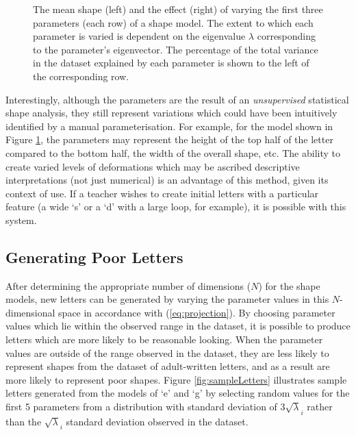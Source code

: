 \documentclass{sig-alternate}
\begin{document}
\begin{figure}[thpb]
\centering
{}
\caption[The mean shape and the effect of varying the first three parameters of
the shape model derived from PCA from the dataset of print `s'
shapes.]{\label{fig:deviations_sPrint}The mean shape (left) and the effect
    (right) of varying the first three parameters (each row) of a shape model.
     The extent to which each
parameter is varied is dependent on the eigenvalue $\lambda$ corresponding to
the parameter's eigenvector. The percentage of the total variance in the dataset
explained by each parameter is shown to the left of the corresponding row. }

\end{figure}

Interestingly, although the parameters are the result of an \emph{unsupervised}
statistical shape analysis, they still represent variations which could have
been intuitively identified by a manual parameterisation. For example, for the
model shown in Figure \ref{fig:deviations_sPrint}, the parameters may represent
the height of the top half of the letter compared to the bottom half, the width
of the overall shape, etc. The ability to create varied levels of deformations
which may be ascribed descriptive interpretations (not just numerical) is an
advantage of this method, given its context of use. If a teacher wishes to
create initial letters with a particular feature (a wide `s' or a `d' with a
large loop, for example), it is possible with this system. 


\subsection{Generating Poor Letters}

After determining the appropriate number of dimensions ($N$) for the shape
models, new letters can be generated by varying the parameter values in this
$N$-dimensional space in accordance with (\ref{eq:projection}). By choosing
parameter values which lie within the observed range in the dataset, it is
possible to produce letters which are more likely to be reasonable looking.
When the parameter values are outside of the range observed in the dataset, they
are less likely to represent shapes from the dataset of adult-written letters, 
and as a result are more likely to represent poor shapes.
Figure \ref{fig:sampleLetters} illustrates sample letters generated from the
models of `e' and `g' by selecting random values for the first 5 parameters 
from a distribution with
standard deviation of $3\sqrt\lambda_i$ rather than the $\sqrt\lambda_i$
standard deviation observed in the dataset.
\end{document}
